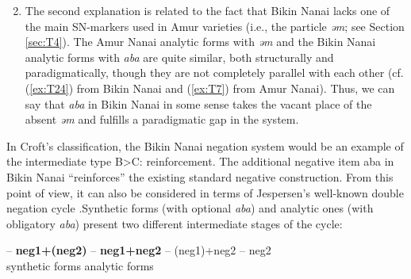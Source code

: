 \documentclass[output=paper]{langscibook}
\begin{document}
\begin{enumerate}
    \setcounter{enumi}{1}
    \item The second explanation is related to the fact that Bikin Nanai lacks one of the main SN-markers used in Amur varieties (i.e., the particle \textit{əm}; see Section \ref{sec:T4}). The Amur Nanai analytic forms with \textit{əm} and the Bikin Nanai analytic forms with \textit{aba} are quite similar, both structurally and paradigmatically, though they are not completely parallel with each other (cf. (\ref{ex:T24}) from Bikin Nanai and (\ref{ex:T7}) from Amur Nanai). Thus, we can say that \textit{aba} in Bikin Nanai in some sense takes the vacant place of the absent \textit{əm} and fulfills a paradigmatic gap in the system.
\end{enumerate}

In Croft’s \citeyearpar{Croft1991} classification, the Bikin Nanai negation system would be an example of the intermediate type B>C: reinforcement. The additional negative item aba in Bikin Nanai “reinforces” the existing standard negative construction. From this point of view, it can also be considered in terms of Jespersen’s well-known double negation cycle \citep{Jespersen1917, Auwera2009, Auwera2010}.\footnotemark Synthetic forms (with optional \textit{aba}) and analytic ones (with obligatory \textit{aba}) present two different intermediate stages of the cycle:


\begin{exe}
     {–} \textbf{neg1+(neg2)} – \textbf{neg1+neg2} – (neg1)+neg2 – neg2\\
    { } { } {synthetic forms} {} {analytic forms}
\end{exe}
\end{document}
